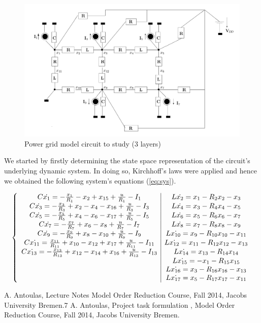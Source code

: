 \documentclass[10pt,a4paper]{article}
\begin{document}
\begin{figure}[!ht]
\centering
\includegraphics[scale=0.35]{./figs/pwr_grid} %
\caption{Power grid model circuit to study (3 layers)}\label{fig:circ}
\end{figure}

We started by firstly determining the state space representation of the circuit's underlying dynamic system. In doing so, Kirchhoff's laws were applied and hence we obtained  the following system's equations (\ref{eq:sys}).

\begin{eqnarray}\label{eq:sys}
\left\lbrace\begin{array}{c | c}
C\dot{x_1} = -\frac{x_1}{R_1} - x_2 + x_{15} + \frac{u}{R_1} - I_1 & L\dot{x_2} = x_1 - R_2x_2 -x_3\\
C\dot{x_3} = -\frac{x_3}{R_3} + x_2 -x_4 - x_{16} + \frac{u}{R_3} - I_3 & L\dot{x_4} = x_3 - R_4x_4 -x_5\\
C\dot{x_5} = -\frac{x_5}{R_5} + x_4 - x_6 - x_{17} + \frac{u}{R_5} - I_5 & L\dot{x_6} = x_5 - R_6x_6 -x_7\\
C\dot{x_7} = -\frac{x_7}{R_7} +x_6 - x_8 + \frac{u}{R_7} - I_7 & L\dot{x_8} = x_7 - R_8x_8 -x_9\\
C\dot{x_9} = -\frac{x_9}{R_9} + x_8 -x_{10}+ \frac{u}{R_9} - I_9 & L\dot{x_{10}} = x_9 - R_{10}x_{10} -x_{11}\\
C\dot{x_{11}} = \frac{x_{11}}{R_{11}} + x_{10} - x_{12} + x_{17} + \frac{u}{R_{11}} - I_{11} & L\dot{x_{12}} = x_{11} - R_{12}x_{12} -x_{13}\\
C\dot{x_{13}} = -\frac{x_{13}}{R_{13}} + x_{12} - x_{14} + x_{16} + \frac{u}{R_{13}} - I_{13} & L\dot{x_{14}} = x_{13} - R_{14}x_{14}\\
& L\dot{x_{15}} = -x_1 - R_{15}x_{15} \\
&L\dot{x_{16}} = x_3 - R_{16}x_{16} -x_{13}\\
&L\dot{x_{17}} = x_5 - R_{17}x_{17} -x_{11}\\
\end{array}\right.
\end{eqnarray}

\begin{thebibliography}{3}
 A. Antoulas, Lecture Notes Model Order Reduction Course, Fall 2014, Jacobs University Bremen.7
 A. Antoulas, Project task formulation , Model Order Reduction Course, Fall 2014, Jacobs University Bremen.
\end{thebibliography}
\end{document}
